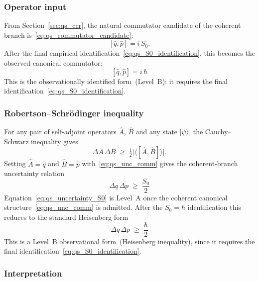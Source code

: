\subsubsection*{Operator input}

From Section~\ref{sec:qs_ccr}, the natural commutator candidate of the
coherent branch is~\eqref{eq:qs_commutator_candidate}:
\begin{equation}
  \label{eq:qs_unc_comm}
  [\hat q,\hat p]
  = i\,S_0.
\end{equation}
After the final empirical identification~\eqref{eq:qs_S0_identification},
this becomes the observed canonical commutator:
\begin{equation}
  \label{eq:qs_unc_comm_hbar}
  [\hat q,\hat p]
  = i\,\hbar
\end{equation}
This is the observationally identified form~(Level~B):
it requires the final identification~\eqref{eq:qs_S0_identification}.

\subsubsection*{Robertson--Schr\"odinger inequality}

For any pair of self-adjoint operators $\hat A$, $\hat B$ and any
state $|\psi\rangle$, the Cauchy--Schwarz inequality gives
\begin{equation}
  \label{eq:qs_robertson}
  \Delta A\,\Delta B
  \;\ge\;
  \tfrac{1}{2}\bigl|\langle[\hat A,\hat B]\rangle\bigr|.
\end{equation}
Setting $\hat A=\hat q$ and $\hat B=\hat p$ with~\eqref{eq:qs_unc_comm}
gives the coherent-branch uncertainty relation
\begin{equation}
  \label{eq:qs_uncertainty_S0}
  \Delta q\,\Delta p
  \;\ge\;
  \frac{S_0}{2}
\end{equation}
Equation~\eqref{eq:qs_uncertainty_S0} is Level~A once the coherent
canonical structure~\eqref{eq:qs_unc_comm} is admitted.
After the $S_0=\hbar$ identification this reduces to the standard
Heisenberg form
\begin{equation}
  \label{eq:qs_uncertainty_hbar}
  \Delta q\,\Delta p
  \;\ge\;
  \frac{\hbar}{2}
\end{equation}
This is a Level~B observational form~(Heisenberg inequality),
since it requires the final identification~\eqref{eq:qs_S0_identification}.

\subsubsection*{Interpretation}

